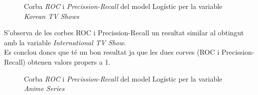 \documentclass[a4paper, 11pt]{article}
\begin{document}
\begin{figure}[h]
\centering
    \caption{Corba \textit{ROC} i \textit{Precission-Recall} del model Logístic per la variable \textit{Korean TV Shows}}
    \label{fig:my_label}
\end{figure}
\hspace{-1.5em}S'observa de les corbes ROC i Precission-Recall un resultat similar al obtingut amb la variable \textit{International TV Show}.\\
Es conclou doncs que té un bon resultat ja que les dues corves (ROC i Precission-Recall) obtenen valors propers a 1.\\
\begin{figure}[h]
\centering
    \caption{Corba \textit{ROC} i \textit{Precission-Recall} del model Logístic per la variable \textit{Anime Series}}
    \label{fig:my_label}
\end{figure}
\end{document}
